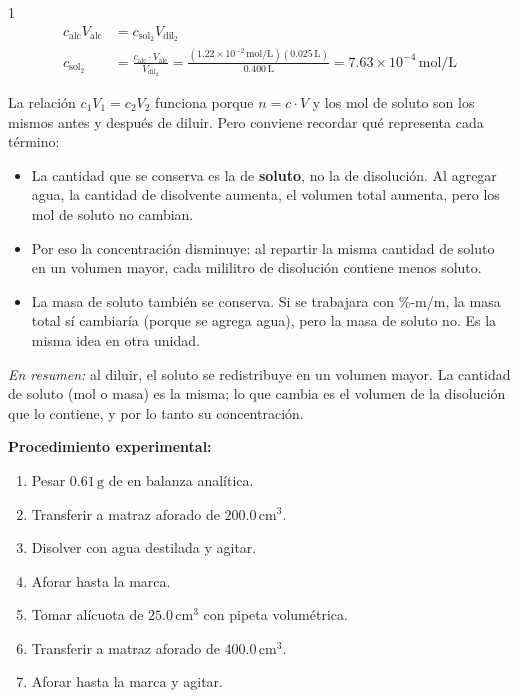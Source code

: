 \begin{exercise}{1}{}
\begin{align*}
    c_{\mathrm{alc}} V_{\mathrm{alc}} &= c_{\mathrm{sol_2}} V_{\mathrm{dil_2}} \\[4pt]
    c_{\mathrm{sol_2}} &= \frac{c_{\mathrm{alc}} \cdot V_{\mathrm{alc}}}{V_{\mathrm{dil_2}}}
    = \frac{(1.22\times10^{-2}\,\mathrm{mol/L})(0.025\,\mathrm{L})}{0.400\,\mathrm{L}}
    = 7.63\times10^{-4}\,\mathrm{mol/L}
\end{align*}

La relación $c_1 V_1 = c_2 V_2$ funciona porque $n = c \cdot V$ y los mol 
de soluto son los mismos antes y después de diluir. Pero conviene recordar qué 
representa cada término:

\begin{itemize}
    \item La cantidad que se conserva es la de \textbf{soluto}, no la de 
    disolución. Al agregar agua, la cantidad de disolvente aumenta, el volumen 
    total aumenta, pero los mol de soluto no cambian.
    \item Por eso la concentración disminuye: al repartir la misma cantidad 
    de soluto en un volumen mayor, cada mililitro de disolución contiene menos 
    soluto.
    \item La masa de soluto también se conserva. Si se trabajara con \%-m/m, 
    la masa total sí cambiaría (porque se agrega agua), pero la masa de soluto 
    no. Es la misma idea en otra unidad.
\end{itemize}

\textit{En resumen:} al diluir, el soluto se redistribuye en un volumen mayor. 
La cantidad de soluto (mol o masa) es la misma; lo que cambia es el volumen 
de la disolución que lo contiene, y por lo tanto su concentración.

\textbf{Procedimiento experimental:}
\begin{enumerate}
    \item Pesar $0.61\,\mathrm{g}$ de  en balanza analítica.
    \item Transferir a matraz aforado de $200.0\,\mathrm{cm^3}$.
    \item Disolver con agua destilada y agitar.
    \item Aforar hasta la marca.
    \item Tomar alícuota de $25.0\,\mathrm{cm^3}$ con pipeta volumétrica.
    \item Transferir a matraz aforado de $400.0\,\mathrm{cm^3}$.
    \item Aforar hasta la marca y agitar.
\end{enumerate}
\end{exercise}


